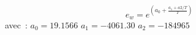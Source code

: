 \[
e_w = e^{ \left( \displaystyle
          a_0 + \frac{a_1 + 
          a2 / T }
          {T}
         \right) }
\]
avec~:\newline
$a_0 = 19.1566 $ \newline
$a_1 = -4061.30 $ \newline
$a_2 = -184965 $\newline
